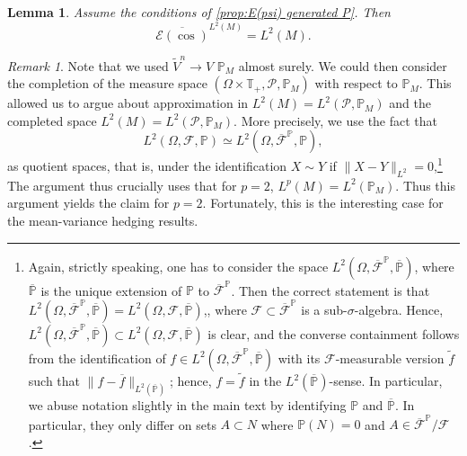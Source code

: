 \documentclass[11pt,a4paper,twoside,openany]{report}
\theoremstyle{plain} %
\newtheorem{lemma}[lemma]{Lemma}
\theoremstyle{definition} %
\theoremstyle{remark} %
\newtheorem{remark}[remark]{Remark}
\begin{document}
\begin{lemma}\label{lemma:density of E(cos) in L2(M)}
Assume the conditions of \cref{prop:E(psi) generated P}. Then 
\begin{equation}
    \overline{\mathcal{E}(\cos)}^{L^2(M)}=L^2(M).
\end{equation}
\end{lemma}
\begin{remark}
    Note that we used \(\widetilde{V}^n\to V\) \(\mathbb{P}_M\) almost surely. We could then consider the completion of the measure space \((\Omega\times\mathbb{T}_+, \mathcal{P},\mathbb{P}_M)\) with respect to \(\mathbb{P}_M\). This allowed us to argue about approximation in \(L^2(M)=L^2(\mathcal{P},\mathbb{P}_M)\) and the completed space \(L^2(M)=L^2(\mathcal{P},\mathbb{P}_M)\). More precisely, we use the fact that 
    \begin{equation}
        L^2(\Omega,\mathcal{F},\mathbb{P})\simeq  L^2(\Omega,\overline{\mathcal{F}}^{\mathbb{P}},\mathbb{P}),
    \end{equation}
    as quotient spaces, that is, under the identification \(X\sim Y\) if \(\lVert X-Y\rVert_{L^2}=0\),\footnote{ Again, strictly speaking, one has to consider the space \(L^2(\Omega,\overline{\mathcal{F}}^{\mathbb{P}},\overline{\mathbb{P}})\), where \(\overline{\mathbb{P}}\) is the unique extension of \(\mathbb{P}\) to \(\overline{\mathcal{F}}^{\mathbb{P}}\). Then the correct statement is that \(L^2(\Omega,\overline{\mathcal{F}}^{\mathbb{P}},\overline{\mathbb{P}})=L^2(\Omega,\mathcal{F},\overline{\mathbb{P}})\),, where \(\mathcal{F}\subset\overline{\mathcal{F}}^{\mathbb{P}}\) is a sub-\(\sigma\)-algebra. Hence, \(L^2(\Omega,\overline{\mathcal{F}}^{\mathbb{P}},\overline{\mathbb{P}})\subset L^2(\Omega,\mathcal{F},\overline{\mathbb{P}})\) is clear, and the converse containment follows from the identification of \(f\in L^2(\Omega,\overline{\mathcal{F}}^{\mathbb{P}},\overline{\mathbb{P}})\) with its \(\mathcal{F}\)-measurable version \(\widetilde{f}\) such that \(\lVert f-\overline{f}\rVert_{L^2(\overline{\mathbb{P}})}\); hence, \(f=\widetilde{f}\) in the \(L^2(\overline{\mathbb{P}})\)-sense. In particular, we abuse notation slightly in the main text by identifying \(\mathbb{P}\) and \(\overline{\mathbb{P}}\). In particular, they only differ on sets \(A\subset N\) where \(\mathbb{P}(N)=0\) and \(A\in\overline{\mathcal{F}}^{\mathbb{P}}/\mathcal{F}\).}
    The argument thus crucially uses that for \(p=2\), \(L^p(M)=L^2(\mathbb{P}_M)\). Thus this argument yields the claim for \(p=2\). Fortunately, this is the interesting case for the mean-variance hedging results. 
\end{remark}
\end{document}
